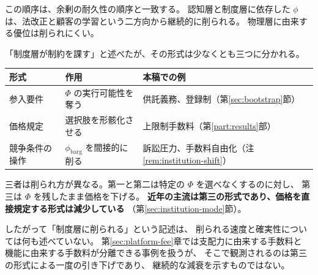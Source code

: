 この順序は、余剰の耐久性の順序と一致する。
認知層と制度層に依存した $\phi$ は、法改正と顧客の学習という二方向から継続的に削られる。
物理層に由来する優位は削られにくい。

\begin{remark}[制度層の作用は一様でない]
\label{rem:institution-modes}
「制度層が制約を課す」と述べたが、その形式は少なくとも三つに分かれる。

\begin{center}
\begin{tabularx}{\textwidth}{@{}lXl@{}}
\toprule
形式 & 作用 & 本稿での例 \\
\midrule
参入要件 & $\Phi$ の実行可能性を奪う & 供託義務、登録制（第\ref{sec:bootstrap}節） \\
価格規定 & 選択肢を形骸化させる & 上限制手数料（第\ref{part:results}部） \\
競争条件の操作 & $\phi_{\mathrm{barg}}$ を間接的に削る & 訴訟圧力、手数料自由化（注\ref{rem:institution-shift}） \\
\bottomrule
\end{tabularx}
\label{tab:institution-modes}
\end{center}

三者は削られ方が異なる。第一と第二は特定の $\Phi$ を選べなくするのに対し、
第三は $\Phi$ を残したまま価格を下げる。
\textbf{近年の主流は第三の形式であり、価格を直接規定する形式は減少している}
（第\ref{sec:institution-mode}節）。

したがって「制度層に削られる」という記述は、
削られる速度と確実性については何も述べていない。
第\ref{sec:platform-fee}章では支配力に由来する手数料と
機能に由来する手数料が分離できる事例を扱うが、
そこで観測されるのは第三の形式による一度の引き下げであり、
継続的な減衰を示すものではない。
\end{remark}
